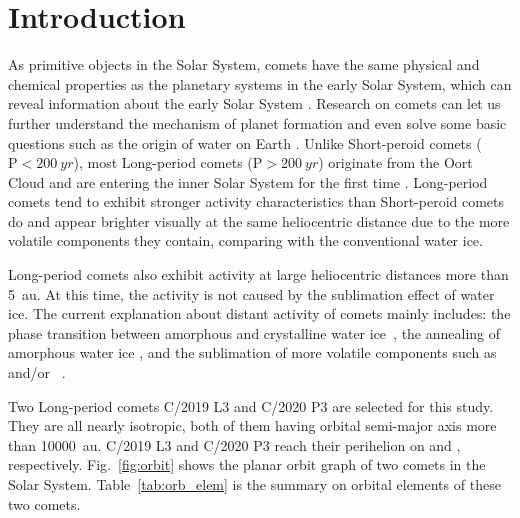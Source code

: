 \section{Introduction}

As primitive objects in the Solar System, comets have the same physical and chemical properties as the planetary systems in the early Solar System, which can reveal information about the early Solar System \citep{mazzotta_epifani_distant_2009, solontoi_ensemble_2012}. Research on comets can let us further understand the mechanism of planet formation and even solve some basic questions such as the origin of water on Earth \citep{alexander_water_2018}. Unlike Short-peroid comets ($\mathrm{P}<\qty{200}{yr}$), most Long-period comets ($\mathrm{P}>\qty{200}{yr}$) originate from the Oort Cloud and are entering the inner Solar System for the first time \citep{jewittCOLORSYSTEMATICSCOMETS2015}. Long-period comets tend to exhibit stronger activity characteristics than Short-peroid comets do and appear brighter visually at the same heliocentric distance due to the more volatile components they contain, comparing with the conventional water ice. 

Long-period comets also exhibit activity at large heliocentric distances more than {\qty{5}{\astronomicalunit}}. At this time, the activity is not caused by the sublimation effect of water ice. The current explanation about distant activity of comets mainly includes: the phase transition between amorphous and crystalline water ice~\citep{prialnik_crystallization_1992, capria_c1995_2002}, the annealing of amorphous water ice \citep{meech_activity_2009}, and the sublimation of more volatile components such as ~\citep{ootsubo_akari_2012} and/or ~\citep{jewitt_distant_2019}. 

Two Long-period comets C/2019 L3 and C/2020 P3 are selected for this study. They are all nearly isotropic, both of them having orbital semi-major axis more than {\qty{10000}{\astronomicalunit}}. C/2019 L3 and C/2020 P3 reach their perihelion on  and , respectively. Fig.~\ref{fig:orbit} shows the planar orbit graph of two comets in the Solar System. Table~\ref{tab:orb_elem} is the summary on orbital elements of these two comets. 


